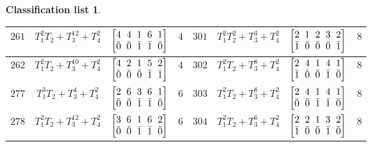 \documentclass[pdftex]{sigma}%
\theoremstyle{definition}
\newtheorem{class-list}[thm]{Classification list}
\numberwithin{equation}{section}
\begin{document}
\begin{class-list}
\begin{table}[h!]
\begin{tabu}{c|c|c|c||c|c|c|c}
\\
\hline
${261}$&${T_{1}^{2}T_{2}+T_{3}^{12}+T_{4}^{2}}$
&$\arraycolsep=1mm\begin{bmatrix}{4} & {4} & {1} & {6} & {1} \\ {\bar{0}} & {\bar{0}} & {\bar{1}} & {\bar{1}} & {\bar{0}}\end{bmatrix}$&${4}$
&${301}$&${T_{1}^{2}T_{2}^{2}+T_{3}^{3}+T_{4}^{2}}$
&$\arraycolsep=1mm\begin{bmatrix}{2} & {1} & {2} & {3} & {2} \\ {\bar{1}} & {\bar{0}} & {\bar{0}} & {\bar{0}} & {\bar{1}}\end{bmatrix}$&${8}$
\\
\hline
${262}$&${T_{1}^{2}T_{2}+T_{3}^{10}+T_{4}^{2}}$
&$\arraycolsep=1mm\begin{bmatrix}{4} & {2} & {1} & {5} & {2} \\ {\bar{0}} & {\bar{0}} & {\bar{0}} & {\bar{1}} & {\bar{1}}\end{bmatrix}$&${4}$
&${302}$&${T_{1}^{2}T_{2}+T_{3}^{8}+T_{4}^{2}}$
&$\arraycolsep=1mm\begin{bmatrix}{2} & {4} & {1} & {4} & {1} \\ {\bar{1}} & {\bar{0}} & {\bar{0}} & {\bar{1}} & {\bar{0}}\end{bmatrix}$&${8}$
\\
\hline
${277}$&${T_{1}^{3}T_{2}+T_{3}^{4}+T_{4}^{2}}$
&$\arraycolsep=1mm\begin{bmatrix}{2} & {6} & {3} & {6} & {1} \\ {\bar{0}} & {\bar{0}} & {\bar{1}} & {\bar{1}} & {\bar{0}}\end{bmatrix}$&${6}$
&${303}$&${T_{1}^{2}T_{2}+T_{3}^{8}+T_{4}^{2}}$
&$\arraycolsep=1mm\begin{bmatrix}{2} & {4} & {1} & {4} & {1} \\ {\bar{0}} & {\bar{0}} & {\bar{1}} & {\bar{1}} & {\bar{0}}\end{bmatrix}$&${8}$
\\
\hline
${278}$&${T_{1}^{2}T_{2}+T_{3}^{12}+T_{4}^{2}}$
&$\arraycolsep=1mm\begin{bmatrix}{3} & {6} & {1} & {6} & {2} \\ {\bar{0}} & {\bar{0}} & {\bar{1}} & {\bar{1}} & {\bar{0}}\end{bmatrix}$&${6}$
&${304}$&${T_{1}^{2}T_{2}+T_{3}^{6}+T_{4}^{2}}$
&$\arraycolsep=1mm\begin{bmatrix}{2} & {2} & {1} & {3} & {2} \\ {\bar{1}} & {\bar{0}} & {\bar{0}} & {\bar{1}} & {\bar{0}}\end{bmatrix}$&${8}$

\end{tabu}
\end{table}
\end{class-list}
\end{document}

